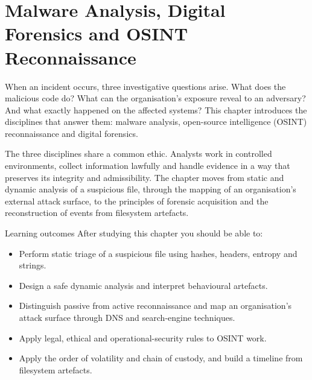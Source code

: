 \chapter{Malware Analysis, Digital Forensics and OSINT Reconnaissance}\label{ch:12}

When an incident occurs, three investigative questions arise. What does the malicious code do? What can the organisation's exposure reveal to an adversary? And what exactly happened on the affected systems? This chapter introduces the disciplines that answer them: malware analysis, open-source intelligence (OSINT) reconnaissance and digital forensics.

The three disciplines share a common ethic. Analysts work in controlled environments, collect information lawfully and handle evidence in a way that preserves its integrity and admissibility. The chapter moves from static and dynamic analysis of a suspicious file, through the mapping of an organisation's external attack surface, to the principles of forensic acquisition and the reconstruction of events from filesystem artefacts.

\begin{outcomesbox}{Learning outcomes}
After studying this chapter you should be able to:
\begin{itemize}
  \item Perform static triage of a suspicious file using hashes, headers, entropy and strings.
  \item Design a safe dynamic analysis and interpret behavioural artefacts.
  \item Distinguish passive from active reconnaissance and map an organisation's attack surface through DNS and search-engine techniques.
  \item Apply legal, ethical and operational-security rules to OSINT work.
  \item Apply the order of volatility and chain of custody, and build a timeline from filesystem artefacts.
\end{itemize}
\end{outcomesbox}

